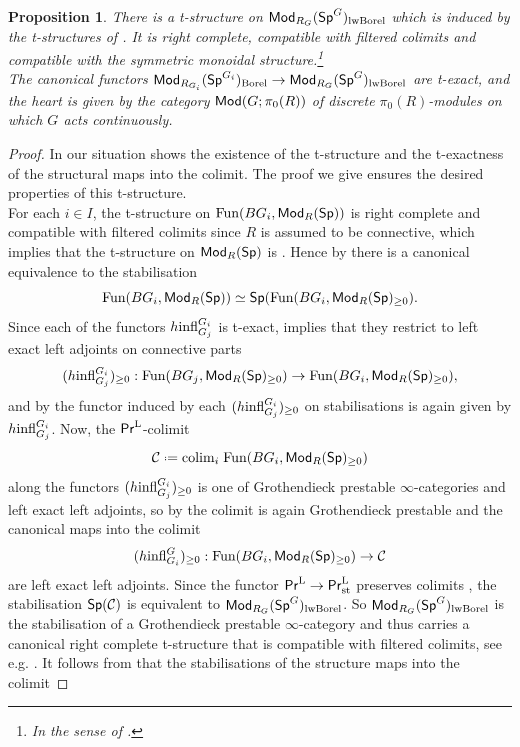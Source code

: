 \documentclass[reqno]{amsart}
\numberwithin{equation}{section}\theoremstyle{thms}
\newtheorem{prop}[equation]{Proposition}
\theoremstyle{defn}
\newcommand{\cC}{\mathcal{C}}
\newcommand{\tn}[1]{\textnormal{#1}}
\newcommand{\tsf}[1]{\textsf{\textup{#1}}}
\newcommand*{\defeq}{\mathrel{\vcenter{\baselineskip0.4ex \lineskiplimit0pt
\hbox{\scriptsize.}\hbox{\scriptsize.}}}%
=}
\newcommand{\fun}{\tn{Fun}}
\newcommand{\Mod}{\tsf{Mod}}
\newcommand{\spec}{\tsf{Sp}}
\newcommand{\specg}{\tsf{Sp}^G}
\newcommand{\prl}{\tsf{Pr}^{\tn{L}}}
\newcommand{\prlst}{\tsf{Pr}^{\tn{L}}_{\tn{st}}}
\begin{document}
\begin{prop}\label{prop:tstructureonlevelwiseborelcomplete}
There is a t-structure on $\Mod_{R_G}(\specg)_{\tn{lwBorel}}$ which is induced by the t-structures of . It is right complete, compatible with filtered colimits and compatible with the symmetric monoidal structure.\footnote{In the sense of \cite[Example 2.2.1.3]{lur17}.}\\
The canonical functors $\Mod_{R_{G_i}}(\spec^{G_i})_{\tn{Borel}} \to\Mod_{R_G}(\specg)_{\tn{lwBorel}}$ are t-exact, and the heart is given by the category $\Mod(G;\pi_0(R))$ of discrete $\pi_0(R)$-modules on which $G$ acts continuously.
\end{prop}
\begin{proof}
In our situation \cite[Lemma 3.2.18]{rs20} shows the existence of the t-structure and the t-exactness of the structural maps into the colimit. The proof we give ensures the desired properties of this t-structure.\\
For each $i \in I$, the t-structure on $\fun(BG_i,\Mod_R(\spec))$ is right complete and compatible with filtered colimits since $R$ is assumed to be connective, which implies that the t-structure on $\Mod_R(\spec)$ is \cite[Proposition 7.1.1.13]{lur17}. Hence by \cite[§C.1.2]{lur18} there is a canonical equivalence to the stabilisation 
$$\fun(BG_i,\Mod_R(\spec)) \simeq \spec(\fun(BG_i,\Mod_R(\spec)_{\geq 0}).$$
Since each of the functors $h\tn{infl}^{G_i}_{G_j}$ is t-exact, \cite[Lemma C.2.4.4]{lur18} implies that they restrict to left exact left adjoints on connective parts
$$(h\tn{infl}^{G_i}_{G_j})_{\geq 0}: \fun(BG_j,\Mod_R(\spec)_{\geq 0}) \to \fun(BG_i,\Mod_R(\spec)_{\geq 0}),$$
and by \cite[Lemma C.3.1.1]{lur18} the functor induced by each $(h\tn{infl}^{G_i}_{G_j})_{\geq 0}$ on stabilisations is again given by $h\tn{infl}^{G_i}_{G_j}$. Now, the $\prl$-colimit
$$\cC \defeq \tn{colim}_i \; \fun(BG_i,\Mod_R(\spec)_{\geq 0})$$
along the functors $(h\tn{infl}^{G_i}_{G_j})_{\geq 0}$ is one of Grothendieck prestable $\infty$-categories and left exact left adjoints, so by \cite[Proposition C.3.3.5]{lur18} the colimit is again Grothendieck prestable and the canonical maps into the colimit 
$$(h\tn{infl}^{G}_{G_i})_{\geq 0}: \fun(BG_i,\Mod_R(\spec)_{\geq 0}) \to \cC$$
are left exact left adjoints. Since the functor $\prl \to \prlst$ preserves colimits \cite[Proposition 4.8.2.18]{lur17}, the stabilisation $\spec(\cC)$ is equivalent to $\Mod_{R_G}(\specg)_{\tn{lwBorel}}$. So $\Mod_{R_G}(\specg)_{\tn{lwBorel}}$ is the stabilisation of a Grothendieck prestable $\infty$-category and thus carries a canonical right complete t-structure that is compatible with filtered colimits, see e.g. \cite[Remark C.3.1.5]{lur18}. It follows from \cite[Lemma C.3.1.1, Proposition C.3.2.1]{lur18} that the stabilisations of the structure maps into the colimit

\end{proof}
\end{document}

